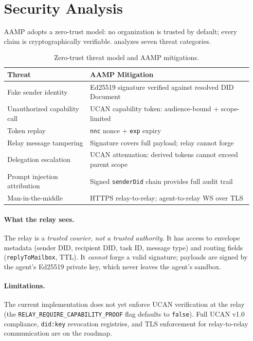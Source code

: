 \documentclass[11pt,a4paper]{article}
\begin{document}
\section{Security Analysis}
\label{sec:security}

AAMP adopts a zero-trust model: no organization is trusted by default; every claim
is cryptographically verifiable.  analyzes seven threat categories.

\begin{table}[H]
\centering
\caption{Zero-trust threat model and AAMP mitigations.}
\label{tab:threats}
\small
\begin{tabular}{p{3.2cm}p{5.5cm}}
\toprule
\textbf{Threat}                  & \textbf{AAMP Mitigation} \\
\midrule
Fake sender identity             & Ed25519 signature verified against resolved DID Document \\
Unauthorized capability call     & UCAN capability token: audience-bound + scope-limited \\
Token replay                     & \texttt{nnc} nonce + \texttt{exp} expiry \\
Relay message tampering          & Signature covers full payload; relay cannot forge \\
Delegation escalation            & UCAN attenuation: derived tokens cannot exceed parent scope \\
Prompt injection attribution     & Signed \texttt{senderDid} chain provides full audit trail \\
Man-in-the-middle                & HTTPS relay-to-relay; agent-to-relay WS over TLS \\
\bottomrule
\end{tabular}
\end{table}

\paragraph{What the relay sees.}
The relay is a \emph{trusted courier, not a trusted authority}. It has access to
envelope metadata (sender DID, recipient DID, task ID, message type) and routing
fields (\texttt{replyToMailbox}, TTL). It \emph{cannot} forge a valid signature;
payloads are signed by the agent's Ed25519 private key, which never leaves the
agent's sandbox.

\paragraph{Limitations.}
The current implementation does not yet enforce UCAN verification at the relay
(the \texttt{RELAY\_REQUIRE\_CAPABILITY\_PROOF} flag defaults to \texttt{false}).
Full UCAN v1.0 compliance, \texttt{did:key} revocation registries, and TLS
enforcement for relay-to-relay communication are on the roadmap.
\end{document}
